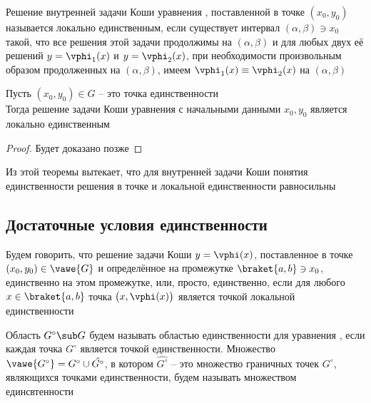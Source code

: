 \begin{definition}\label{def:uniq:local}
    Решение внутренней задачи Коши уравнения , поставленной в точке $ (x_0, y_0) $ называется локально единственным, если существует интервал $ (\alpha, \beta) \ni x_0 $ такой, что все решения этой задачи продолжимы на $ (\alpha, \beta) $ и для любых двух её решений $ y = \vphi_1(x) $ и $ y = \vphi_2(x) $, при необходимости произвольным образом продолженных на $ (\alpha, \beta) $, имеем $ \vphi_1(x) \equiv \vphi_2(x) $ на $ (\alpha, \beta) $
\end{definition}

\begin{theorem}\label{th:uniq-and-local-uniq}
	Пусть $ (x_0, y_0) \in G $ -- это точка единственности \\
    Тогда решение задачи Коши уравнения  с начальными данными $ x_0, y_0 $ является локально единственным
\end{theorem}

\begin{proof}
	Будет доказано позже
\end{proof}

\begin{implication}
	Из этой теоремы вытекает, что для внутренней задачи Коши понятия единственности решения в точке и локальной единственности равносильны
\end{implication}

\subsection{Достаточные условия единственности}

\begin{definition}
    Будем говорить, что решение задачи Коши $ y = \vphi(x) $, поставленное в точке $ (x_0, y_0) \in \vawe{G} $ и определённое на промежутке $ \braket{a, b} \ni x_0 $, единственно на этом промежутке, или, просто, единственно, если для любого $ x \in \braket{a, b} $ точка $ \big( x, \vphi(x) \big) $ является точкой локальной единственности
\end{definition}

\begin{definition}
    Область $ G^\circ \sub G $ будем называть областью единственности для уравнения , если каждая точка $ G^\circ $ является точкой единственности. Множество $ \vawe{G^\circ} = G^\circ \cup \hat{G^\circ} $, в котором $ \hat{G^\circ} $ -- это множество граничных точек $ G^\circ $, являющихся точками единственности, будем называть множеством единсвтенности
\end{definition}

